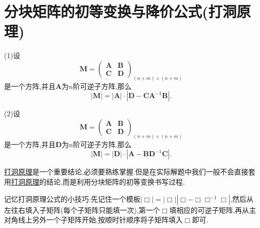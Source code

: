 \documentclass[../../main.tex]{subfiles}%
\begin{document}
\section{分块矩阵的初等变换与降价公式(打洞原理)}

\begin{proposition}[打洞原理]\label{proposition:打洞原理}
(1)设
\[
\boldsymbol{M} = 
\begin{pmatrix}
\boldsymbol{A} & \boldsymbol{B} \\
\boldsymbol{C} & \boldsymbol{D}
\end{pmatrix}_{(n + m) \times (n + m)}
\]
是一个方阵,并且\(\boldsymbol{A}\)为\(n\)阶可逆子方阵,那么
\[
|\boldsymbol{M}| = |\boldsymbol{A}| \cdot |\boldsymbol{D} - \boldsymbol{C}\boldsymbol{A}^{-1}\boldsymbol{B}|.
\]

(2)设
\[
\boldsymbol{M} = 
\begin{pmatrix}
\boldsymbol{A} & \boldsymbol{B} \\
\boldsymbol{C} & \boldsymbol{D}
\end{pmatrix}_{(n + m) \times (n + m)}
\]
是一个方阵,并且\(\boldsymbol{D}\)为\(n\)阶可逆子方阵,那么
\[
|\boldsymbol{M}| = |\boldsymbol{D}| \cdot |\boldsymbol{A} - \boldsymbol{B}\boldsymbol{D}^{-1}\boldsymbol{C}|.
\]
\end{proposition}
\begin{note}
\hyperref[proposition:打洞原理]{打洞原理}是一个重要结论,必须要熟练掌握.但是在实际解题中我们一般不会直接套用\hyperref[proposition:打洞原理]{打洞原理}的结论,而是利用分块矩阵的初等变换书写过程.

记忆打洞原理公式的小技巧:先记住一个模板$\left| \Box \right|=\left| \Box \right|\left| \Box -\Box \Box ^{-1}\Box \right|$,然后从左往右填入子矩阵(每个子矩阵只能填一次),第一个$\Box$填相应的可逆子矩阵,再从主对角线上另外一个子矩阵开始,按顺时针顺序将子矩阵填入$\Box$即可.
\end{note}
\end{document}
